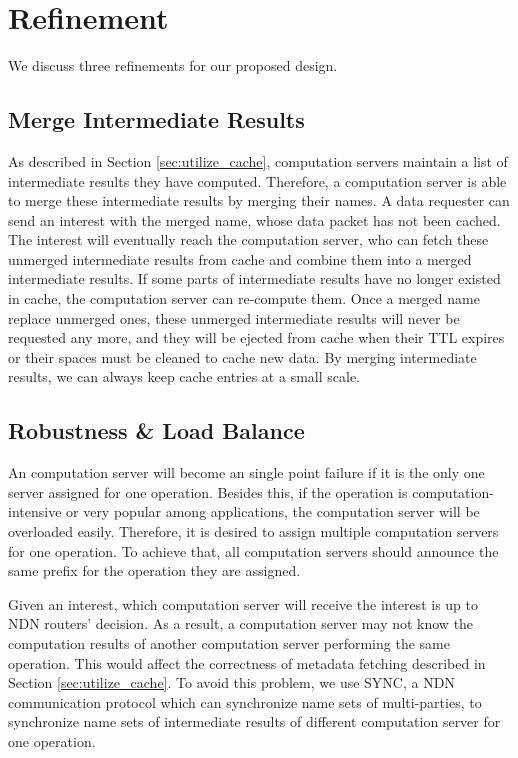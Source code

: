 \section{Refinement}
We discuss three refinements for our proposed design.
\subsection{Merge Intermediate Results}\label{sec:merge}
As described in Section \ref{sec:utilize_cache}, computation servers maintain a list
of intermediate results they have computed.  Therefore, a computation server is
able to merge these intermediate results by merging their names.  A data
requester can send an {\sc interest} with the merged name, whose {\sc data}
packet has not been cached.  The {\sc interest} will eventually reach the
computation server, who can fetch these unmerged intermediate results from cache
and combine them into a merged intermediate results.  If some parts of
intermediate results have no longer existed in cache, the computation server can
re-compute them.  Once a merged name replace unmerged ones, these unmerged
intermediate results will never be requested any more, and they will be ejected
from cache when their TTL expires or their spaces must be cleaned to cache new
data.  By merging intermediate results, we can always keep cache entries at a
small scale.
\subsection{Robustness \& Load Balance} \label{sec:robust}
An computation server will become an single point failure if it is the only one
server assigned for one operation.  Besides this, if the operation is
computation-intensive or very popular among applications, the computation server
will be overloaded easily.  Therefore, it is desired to assign multiple
computation servers for one operation.  To achieve that, all computation servers
should announce the same prefix for the operation they are assigned.  

Given an {\sc interest}, which computation server will receive the {\sc
  interest} is up to NDN routers' decision.  As a result, a computation server
may not know the computation results of another computation server performing
the same operation.  This would affect the correctness of metadata fetching
described in Section \ref{sec:utilize_cache}.  To avoid this problem, we use
SYNC, a NDN communication protocol which can synchronize name sets of
multi-parties, to synchronize name sets of intermediate results of different
computation server for one operation. 


